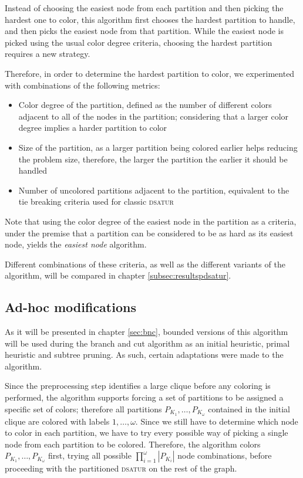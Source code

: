 Instead of choosing the easiest node from each partition and then picking the hardest one to color, this algorithm first chooses the hardest partition to handle, and then picks the easiest node from that partition. While the easiest node is picked using the usual color degree criteria, choosing the hardest partition requires a new strategy. 

Therefore, in order to determine the hardest partition to color, we experimented with combinations of the following metrics:
\begin{itemize}
	\item{Color degree of the partition, defined as the number of different colors adjacent to all of the nodes in the partition; considering that a larger color degree implies a harder partition to color}
	\item{Size of the partition, as a larger partition being colored earlier helps reducing the problem size, therefore, the larger the partition the earlier it should be handled}
	\item{Number of uncolored partitions adjacent to the partition, equivalent to the tie breaking criteria used for classic \textsc{dsatur}} 
\end{itemize}

Note that using the color degree of the easiest node in the partition as a criteria, under the premise that a partition can be considered to be as hard as its easiest node, yields the \textit{easiest node} algorithm.

Different combinations of these criteria, as well as the different variants of the algorithm, will be compared in chapter \ref{subsec:resultspdsatur}.

\subsection{Ad-hoc modifications}

As it will be presented in chapter \ref{sec:bnc}, bounded versions of this algorithm will be used during the branch and cut algorithm as an initial heuristic, primal heuristic and subtree pruning. As such, certain adaptations were made to the algorithm.

Since the preprocessing step identifies a large clique before any coloring is performed, the algorithm supports forcing a set of partitions to be assigned a specific set of colors; therefore all partitions $P_{K_1},\ldots,P_{K_\omega}$ contained in the initial clique are colored with labels $1,\ldots,\omega$. Since we still have to determine which node to color in each partition, we have to try every possible way of picking a single node from each partition to be colored. Therefore, the algorithm colors $P_{K_1},\ldots,P_{K_\omega}$ first, trying all possible $\prod_{i=1}^{\omega} |P_{K_i}|$ node combinations, before proceeding with the partitioned \textsc{dsatur} on the rest of the graph.

